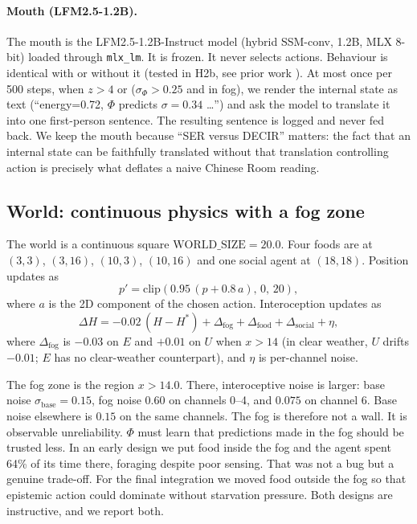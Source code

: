 \documentclass[11pt,a4paper]{article}
\begin{document}
\paragraph{Mouth (LFM2.5-1.2B).} The mouth is the LFM2.5-1.2B-Instruct model (hybrid SSM-conv, 1.2B, MLX 8-bit) loaded through \texttt{mlx\_lm}. It is frozen. It never selects actions. Behaviour is identical with or without it (tested in H2b, see prior work \cite{lfm2025}). At most once per 500 steps, when $z>4$ or ($\sigma_\Phi>0.25$ and in fog), we render the internal state as text (``energy=0.72, $\Phi$ predicts $\sigma=0.34$ \dots'') and ask the model to translate it into one first-person sentence. The resulting sentence is logged and never fed back. We keep the mouth because ``SER versus DECIR'' matters: the fact that an internal state can be faithfully translated without that translation controlling action is precisely what deflates a naive Chinese Room reading.

\subsection{World: continuous physics with a fog zone}

The world is a continuous square $\mathrm{WORLD\_SIZE}=20.0$. Four foods are at $(3,3)$, $(3,16)$, $(10,3)$, $(10,16)$ and one social agent at $(18,18)$. Position updates as
\begin{equation}
p' = \mathrm{clip}(0.95 \,(p + 0.8\,a),\, 0,\, 20),
\end{equation}
where $a$ is the 2D component of the chosen action. Interoception updates as
\begin{equation}
\Delta H = -0.02\,(H-H^*) + \Delta_{\mathrm{fog}} + \Delta_{\mathrm{food}} + \Delta_{\mathrm{social}} + \eta,
\end{equation}
where $\Delta_{\mathrm{fog}}$ is $-0.03$ on $E$ and $+0.01$ on $U$ when $x>14$ (in clear weather, $U$ drifts $-0.01$; $E$ has no clear-weather counterpart), and $\eta$ is per-channel noise.

The fog zone is the region $x>14.0$. There, interoceptive noise is larger: base noise $\sigma_{\mathrm{base}}=0.15$, fog noise $0.60$ on channels 0--4, and $0.075$ on channel 6. Base noise elsewhere is $0.15$ on the same channels. The fog is therefore not a wall. It is observable unreliability. $\Phi$ must learn that predictions made in the fog should be trusted less. In an early design we put food inside the fog and the agent spent 64\% of its time there, foraging despite poor sensing. That was not a bug but a genuine trade-off. For the final integration we moved food outside the fog so that epistemic action could dominate without starvation pressure. Both designs are instructive, and we report both.
\end{document}
